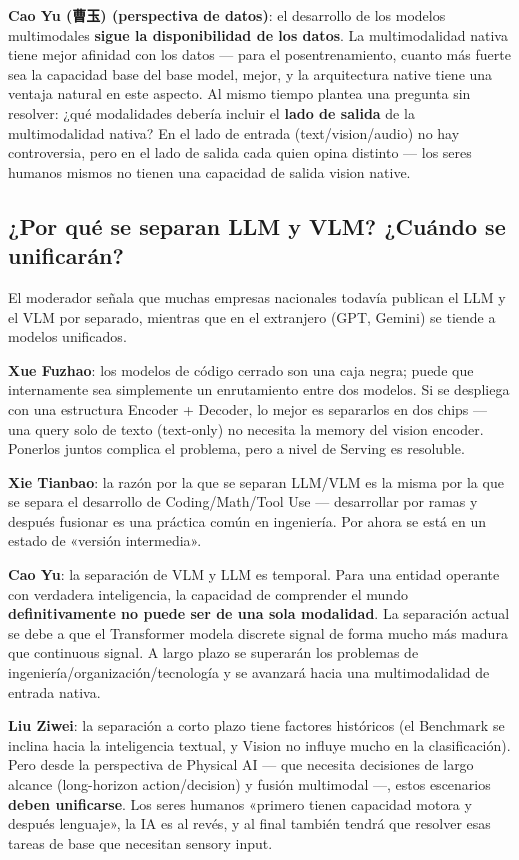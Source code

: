 \documentclass[a4paper]{article}
\begin{document}
\textbf{Cao Yu (曹玉) (perspectiva de datos)}: el desarrollo de los modelos multimodales \textbf{sigue la disponibilidad de los datos}. La multimodalidad nativa tiene mejor afinidad con los datos — para el posentrenamiento, cuanto más fuerte sea la capacidad base del base model, mejor, y la arquitectura native tiene una ventaja natural en este aspecto. Al mismo tiempo plantea una pregunta sin resolver: ¿qué modalidades debería incluir el \textbf{lado de salida} de la multimodalidad nativa? En el lado de entrada (text/vision/audio) no hay controversia, pero en el lado de salida cada quien opina distinto — los seres humanos mismos no tienen una capacidad de salida vision native.

\subsection{¿Por qué se separan LLM y VLM? ¿Cuándo se unificarán?}

El moderador señala que muchas empresas nacionales todavía publican el LLM y el VLM por separado, mientras que en el extranjero (GPT, Gemini) se tiende a modelos unificados.

\textbf{Xue Fuzhao}: los modelos de código cerrado son una caja negra; puede que internamente sea simplemente un enrutamiento entre dos modelos. Si se despliega con una estructura Encoder + Decoder, lo mejor es separarlos en dos chips — una query solo de texto (text-only) no necesita la memory del vision encoder. Ponerlos juntos complica el problema, pero a nivel de Serving es resoluble.

\textbf{Xie Tianbao}: la razón por la que se separan LLM/VLM es la misma por la que se separa el desarrollo de Coding/Math/Tool Use — desarrollar por ramas y después fusionar es una práctica común en ingeniería. Por ahora se está en un estado de «versión intermedia».

\textbf{Cao Yu}: la separación de VLM y LLM es temporal. Para una entidad operante con verdadera inteligencia, la capacidad de comprender el mundo \textbf{definitivamente no puede ser de una sola modalidad}. La separación actual se debe a que el Transformer modela discrete signal de forma mucho más madura que continuous signal. A largo plazo se superarán los problemas de ingeniería/organización/tecnología y se avanzará hacia una multimodalidad de entrada nativa.

\textbf{Liu Ziwei}: la separación a corto plazo tiene factores históricos (el Benchmark se inclina hacia la inteligencia textual, y Vision no influye mucho en la clasificación). Pero desde la perspectiva de Physical AI — que necesita decisiones de largo alcance (long-horizon action/decision) y fusión multimodal —, estos escenarios \textbf{deben unificarse}. Los seres humanos «primero tienen capacidad motora y después lenguaje», la IA es al revés, y al final también tendrá que resolver esas tareas de base que necesitan sensory input.
\end{document}
